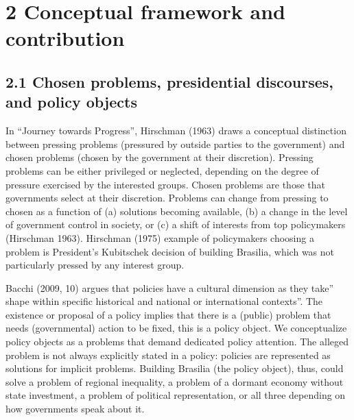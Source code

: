 \documentclass[
  12pt,
]{article}
\begin{document}
\hypertarget{conceptual-framework-and-contribution}{%
\section{2 Conceptual framework and
contribution}\label{conceptual-framework-and-contribution}}

\hypertarget{chosen-problems-presidential-discourses-and-policy-objects}{%
\subsection{2.1 Chosen problems, presidential discourses, and policy
objects}\label{chosen-problems-presidential-discourses-and-policy-objects}}

In ``Journey towards Progress'', Hirschman (1963) draws a conceptual
distinction between pressing problems (pressured by outside parties to
the government) and chosen problems (chosen by the government at their
discretion). Pressing problems can be either privileged or neglected,
depending on the degree of pressure exercised by the interested groups.
Chosen problems are those that governments select at their discretion.
Problems can change from pressing to chosen as a function of (a)
solutions becoming available, (b) a change in the level of government
control in society, or (c) a shift of interests from top policymakers
(Hirschman 1963). Hirschman (1975) example of policymakers choosing a
problem is President's Kubitschek decision of building Brasilia, which
was not particularly pressed by any interest group.

Bacchi (2009, 10) argues that policies have a cultural dimension as they
take'' shape within specific historical and national or international
contexts''. The existence or proposal of a policy implies that there is
a (public) problem that needs (governmental) action to be fixed, this is
a policy object. We conceptualize policy objects as a problems that
demand dedicated policy attention. The alleged problem is not always
explicitly stated in a policy: policies are represented as solutions for
implicit problems. Building Brasilia (the policy object), thus, could
solve a problem of regional inequality, a problem of a dormant economy
without state investment, a problem of political representation, or all
three depending on how governments speak about it.
\end{document}
